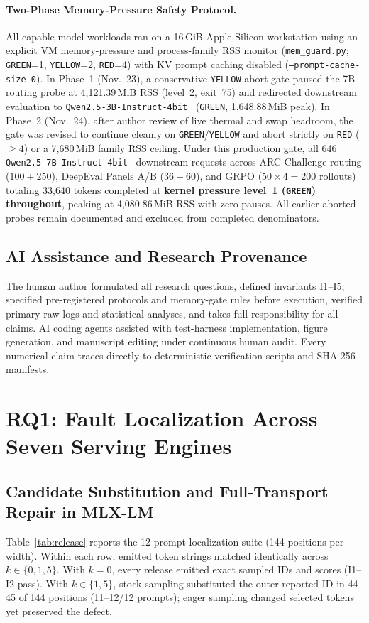 \documentclass[11pt,letterpaper]{article}
\begin{document}
\paragraph{Two-Phase Memory-Pressure Safety Protocol.}
All capable-model workloads ran on a 16\,GiB Apple Silicon workstation using an explicit VM memory-pressure and process-family RSS monitor (\texttt{mem\_guard.py}; \texttt{GREEN}=1, \texttt{YELLOW}=2, \texttt{RED}=4) with KV prompt caching disabled (\texttt{--prompt-cache-size 0}). In Phase~1 (Nov.\ 23), a conservative \texttt{YELLOW}-abort gate paused the 7B routing probe at 4,121.39\,MiB RSS (level~2, exit~75) and redirected downstream evaluation to \texttt{Qwen2.5-3B-Instruct-4bit}~\cite{qwen3b} (\texttt{GREEN}, 1,648.88\,MiB peak). In Phase~2 (Nov.\ 24), after author review of live thermal and swap headroom, the gate was revised to continue cleanly on \texttt{GREEN}/\texttt{YELLOW} and abort strictly on \texttt{RED} ($\ge 4$) or a 7,680\,MiB family RSS ceiling. Under this production gate, all 646 \texttt{Qwen2.5-7B-Instruct-4bit}~\cite{qwen7b} downstream requests across ARC-Challenge routing ($100+250$), DeepEval Panels A/B ($36+60$), and GRPO ($50\times 4 = 200$ rollouts) totaling 33,640 tokens completed at \textbf{kernel pressure level~1 (\texttt{GREEN}) throughout}, peaking at 4,080.86\,MiB RSS with zero pauses. All earlier aborted probes remain documented and excluded from completed denominators.

\subsection{AI Assistance and Research Provenance}
The human author formulated all research questions, defined invariants \textsc{I1}--\textsc{I5}, specified pre-registered protocols and memory-gate rules before execution, verified primary raw logs and statistical analyses, and takes full responsibility for all claims. AI coding agents assisted with test-harness implementation, figure generation, and manuscript editing under continuous human audit. Every numerical claim traces directly to deterministic verification scripts and SHA-256 manifests.

\section{RQ1: Fault Localization Across Seven Serving Engines}
\label{sec:rq1}

\subsection{Candidate Substitution and Full-Transport Repair in MLX-LM}
\label{sec:rq1-mlx}
Table~\ref{tab:release} reports the 12-prompt localization suite (144 positions per width). Within each row, emitted token strings matched identically across $k \in \{0, 1, 5\}$. With $k=0$, every release emitted exact sampled IDs and scores (\textsc{I1}--\textsc{I2} pass). With $k \in \{1, 5\}$, stock sampling substituted the outer reported ID in 44--45 of 144 positions (11--12/12 prompts); eager sampling changed selected tokens yet preserved the defect.
\end{document}
